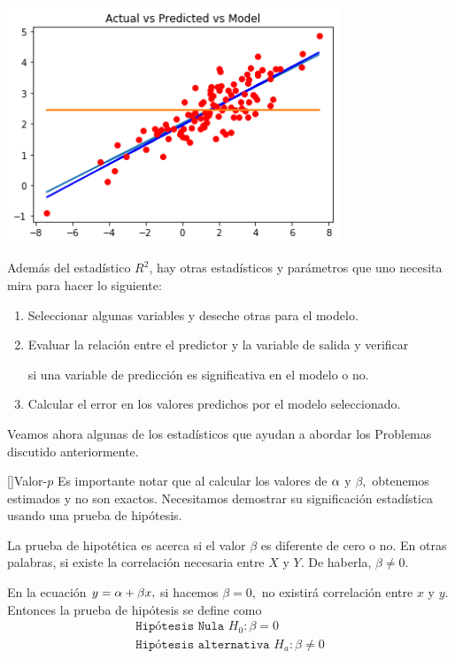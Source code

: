 \begin{center}
 \includegraphics[width=10cm,keepaspectratio=true]{./images/optimalValue.png}
\end{center}



Además del estadístico $R^{2}$, hay otras estadísticos y parámetros que uno necesita
mira para hacer lo siguiente:


\begin{enumerate}
\item Seleccionar algunas variables y deseche otras para el modelo.


\item Evaluar la relación entre el predictor y la variable de salida y verificar


si una variable de predicción es significativa en el modelo o no.
\item Calcular el error en los valores predichos por el modelo seleccionado.
\end{enumerate}




Veamos ahora algunas de los estadísticos que ayudan a abordar los Problemas
discutido anteriormente.

[]{Valor-$p$}
Es importante notar que al calcular los valores de $\alpha$ y $\beta,$ obtenemos estimados y no son exactos. Necesitamos demostrar su significación estadística usando una prueba de hipótesis.


La prueba de hipotética es acerca si el valor $\beta$ es diferente de cero o no. En otras palabras, si existe la correlación necesaria entre $X$ y $Y$. De haberla, $\beta \neq 0$.


En la ecuación $y = \alpha + \beta x,$ si hacemos $\beta=0,$ no existirá correlación entre $x$ y $y$. Entonces la prueba de hipótesis se define como
\begin{align}
 \texttt{Hipótesis Nula }H_{0}:\beta=0 \\
 \texttt{Hipótesis alternativa }H_{a}: \beta \neq 0
\end{align}




